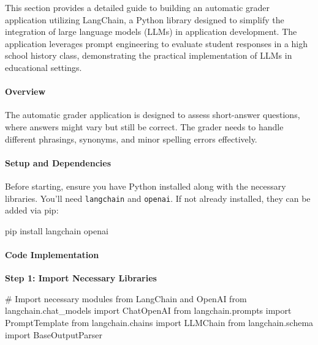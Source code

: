 \documentclass[
]{agujournal2019}
\let\oldparagraph\paragraph
\renewcommand{\paragraph}[1]{\oldparagraph{#1}\mbox{}}
\newenvironment{Shaded}{\begin{snugshade}}{\end{snugshade}}
\newcommand{\CommentTok}[1]{\textcolor[rgb]{0.37,0.37,0.37}{#1}}
\newcommand{\ExtensionTok}[1]{\textcolor[rgb]{0.00,0.23,0.31}{#1}}
\newcommand{\ImportTok}[1]{\textcolor[rgb]{0.00,0.46,0.62}{#1}}
\newcommand{\NormalTok}[1]{\textcolor[rgb]{0.00,0.23,0.31}{#1}}
\begin{document}
This section provides a detailed guide to building an automatic grader
application utilizing LangChain, a Python library designed to simplify
the integration of large language models (LLMs) in application
development. The application leverages prompt engineering to evaluate
student responses in a high school history class, demonstrating the
practical implementation of LLMs in educational settings.

\paragraph{Overview}\label{overview}

The automatic grader application is designed to assess short-answer
questions, where answers might vary but still be correct. The grader
needs to handle different phrasings, synonyms, and minor spelling errors
effectively.

\paragraph{Setup and Dependencies}\label{setup-and-dependencies}

Before starting, ensure you have Python installed along with the
necessary libraries. You'll need \texttt{langchain} and \texttt{openai}.
If not already installed, they can be added via pip:

\begin{Shaded}
\begin{Highlighting}[]
\ExtensionTok{pip}\NormalTok{ install langchain openai}
\end{Highlighting}
\end{Shaded}

\paragraph{Code Implementation}\label{code-implementation}

\textbf{Step 1: Import Necessary Libraries}

\begin{Shaded}
\begin{Highlighting}[]
\CommentTok{\# Import necessary modules from LangChain and OpenAI}
\ImportTok{from}\NormalTok{ langchain.chat\_models }\ImportTok{import}\NormalTok{ ChatOpenAI}
\ImportTok{from}\NormalTok{ langchain.prompts }\ImportTok{import}\NormalTok{ PromptTemplate}
\ImportTok{from}\NormalTok{ langchain.chains }\ImportTok{import}\NormalTok{ LLMChain}
\ImportTok{from}\NormalTok{ langchain.schema }\ImportTok{import}\NormalTok{ BaseOutputParser}
\end{Highlighting}
\end{Shaded}
\end{document}
